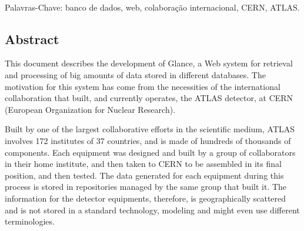 %
%

%
%

\paragraph{}

\noindent Palavras-Chave: banco de dados, web, colaboração internacional, CERN,
ATLAS.

\vfill

\cleardoublepage

\vfill
\begin{center}
\section*{Abstract\label{Abstract}}
\end{center}

This document describes the development of Glance, a Web system for retrieval
and processing of big amounts of data stored in different databases.
%
The motivation for this system has come from the necessities of the
international collaboration that built, and currently operates, the ATLAS
detector, at CERN (European Organization for Nuclear Research).

Built by one of the largest collaborative efforts in the scientific medium,
ATLAS involves 172 institutes of 37 countries, and is made of hundreds of
thousands of components.
%
Each equipment was designed and built by a group of collaborators in their home
institute, and then taken to CERN to be assembled in its final position, and
then tested.
%
The data generated for each equipment during this process is stored in
repositories managed by the same group that built it.
%
The information for the detector equipments, therefore, is geographically
scattered and is not stored in a standard technology, modeling and might even
use different terminologies.

